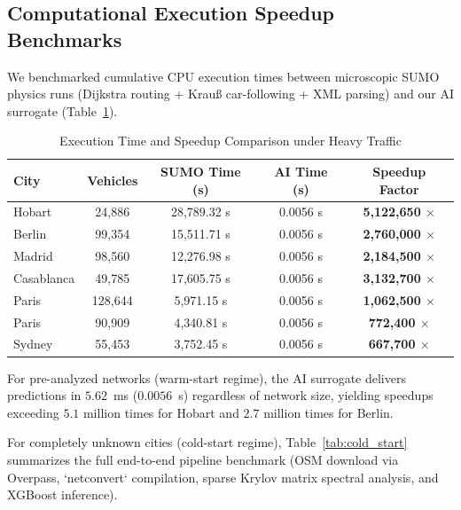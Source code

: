 \documentclass[lettersize,journal]{IEEEtran}
\begin{document}
\subsection{Computational Execution Speedup Benchmarks}
We benchmarked cumulative CPU execution times between microscopic SUMO physics runs (Dijkstra routing + Krauß car-following + XML parsing) and our AI surrogate (Table~\ref{tab:speedup_heavy}).

\begin{table}[htbp]
\caption{Execution Time and Speedup Comparison under Heavy Traffic}
\label{tab:speedup_heavy}
\centering
\begin{tabular}{lcccc}
\toprule
City & Vehicles & SUMO Time (s) & AI Time (s) & Speedup Factor \\
\midrule
Hobart & 24,886 & 28,789.32 s & 0.0056 s & \textbf{5,122,650 $\times$} \\
Berlin & 99,354 & 15,511.71 s & 0.0056 s & \textbf{2,760,000 $\times$} \\
Madrid & 98,560 & 12,276.98 s & 0.0056 s & \textbf{2,184,500 $\times$} \\
Casablanca & 49,785 & 17,605.75 s & 0.0056 s & \textbf{3,132,700 $\times$} \\
Paris & 128,644 & 5,971.15 s & 0.0056 s & \textbf{1,062,500 $\times$} \\
Paris & 90,909 & 4,340.81 s & 0.0056 s & \textbf{772,400 $\times$} \\
Sydney & 55,453 & 3,752.45 s & 0.0056 s & \textbf{667,700 $\times$} \\
\bottomrule
\end{tabular}
\end{table}

For pre-analyzed networks (warm-start regime), the AI surrogate delivers predictions in $5.62$~ms ($0.0056$~s) regardless of network size, yielding speedups exceeding $5.1$ million times for Hobart and $2.7$ million times for Berlin. 

For completely unknown cities (cold-start regime), Table~\ref{tab:cold_start} summarizes the full end-to-end pipeline benchmark (OSM download via Overpass, `netconvert` compilation, sparse Krylov matrix spectral analysis, and XGBoost inference).
\end{document}
